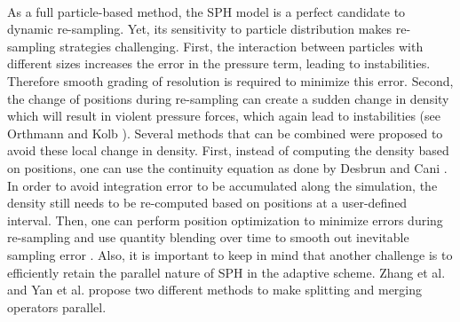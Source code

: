 \paragraph*{}
As a full particle-based method, the SPH model is a perfect candidate to dynamic re-sampling. Yet, its sensitivity to particle distribution makes re-sampling strategies challenging. First, the interaction between particles with different sizes increases the error in the pressure term, leading to instabilities. Therefore smooth grading of resolution is required to minimize this error. Second, the change of positions during re-sampling can create a sudden change in density which will result in violent pressure forces, which again lead to instabilities (see Orthmann and Kolb \cite{Orthmann2012}).
Several methods that can be combined were proposed to avoid these local change in density. First, instead of computing the density based on positions, one can use the continuity equation as done by Desbrun and Cani \cite{Desbrun1999}. In order to avoid integration error to be accumulated along the simulation, the density still needs to be re-computed based on positions at a user-defined interval. Then, one can perform position optimization to minimize errors during re-sampling \cite{Adams2007} and use quantity blending over time to smooth out inevitable sampling error \cite{Orthmann2012}.
Also, it is important to keep in mind that another challenge is to efficiently retain the parallel nature of SPH in the adaptive scheme. Zhang et al. \cite{Zhang2008} and Yan et al. \cite{Yan2009} propose two different methods to make splitting and merging operators parallel.
